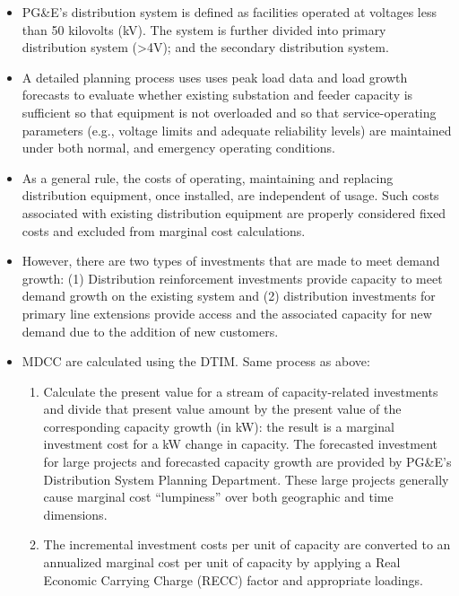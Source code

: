 \documentclass[11pt]{article}
\begin{document}
\begin{itemize}
\begin{itemize}
\item PG&E’s distribution system is defined as facilities operated at voltages less than 50 kilovolts (kV). The system is further divided into primary distribution system (>4V); and  the secondary distribution system. 

\item A detailed planning process uses uses peak load data and load growth forecasts to evaluate whether existing substation and feeder capacity is sufficient so that equipment is not overloaded and so that  service-operating parameters (e.g., voltage limits and adequate reliability levels) are maintained under both normal, and emergency operating conditions.

\item As a general rule, the costs of operating, maintaining and replacing distribution equipment, once installed, are independent of usage. Such costs associated with existing distribution equipment are properly considered fixed
costs and excluded from marginal cost calculations.

\item However, there are two types of investments that are made to meet demand growth: (1) Distribution reinforcement investments provide capacity  to meet demand growth on the existing system and (2) distribution investments for primary line extensions provide access and the associated capacity for new demand due to the addition of new customers. 

\item MDCC are calculated using the DTIM.  Same process as above:

\begin{enumerate} 

\item Calculate the present value for a stream of capacity-related  investments and divide that present value amount by the present value of the corresponding capacity growth (in kW): the result is a marginal investment cost for a kW change in capacity.  The forecasted investment for large projects and  forecasted capacity growth  are provided by  PG&E’s Distribution System Planning Department. These large  projects generally cause marginal cost “lumpiness” over both geographic and time dimensions.
 
\item The incremental investment costs per unit of capacity are converted to an annualized marginal cost per unit of capacity by applying a Real Economic Carrying Charge (RECC) factor and  appropriate loadings. 


\end{enumerate}
\end{itemize}
\end{itemize}
\end{document}
